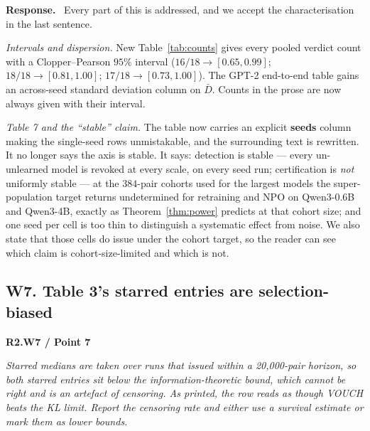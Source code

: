 \documentclass[11pt,a4paper]{article}
\newenvironment{point}[1]{%
  \par\medskip\noindent\textbf{\color{rcol}#1}\par\nopagebreak\smallskip\begingroup
  \color{rcol}\itshape}{\endgroup\par}
\newenvironment{reply}{%
  \par\smallskip\noindent\textbf{\color{acol}Response.}\ \begingroup}{\endgroup\par}
\begin{document}
\begin{reply}
Every part of this is addressed, and we accept the characterisation in the last
sentence.

\emph{Intervals and dispersion.} New Table~\ref{tab:counts} gives every pooled verdict count with a
Clopper--Pearson $95\%$ interval ($16/18 \to [0.65,0.99]$; $18/18 \to [0.81,1.00]$;
$17/18 \to [0.73,1.00]$). The GPT-2 end-to-end table gains an across-seed standard
deviation column on $\bar D$. Counts in the prose are now always given with their
interval.

\emph{Table 7 and the ``stable'' claim.} The table now carries an explicit
\textbf{seeds} column making the single-seed rows unmistakable, and the surrounding
text is rewritten. It no longer says the axis is stable. It says: detection is stable
--- every un-unlearned model is revoked at every scale, on every seed run; certification
is \emph{not} uniformly stable --- at the $384$-pair cohorts used for the largest models
the super-population target returns undetermined for retraining and NPO on Qwen3-0.6B
and Qwen3-4B, exactly as Theorem~\ref{thm:power} predicts at that cohort size; and one seed per cell
is too thin to distinguish a systematic effect from noise. We also state that those
cells do issue under the cohort target, so the reader can see which claim is
cohort-size-limited and which is not.
\end{reply}

\subsection*{W7. Table 3's starred entries are selection-biased}

\begin{point}{R2.W7 / Point 7}
Starred medians are taken over runs that issued within a 20,000-pair horizon, so both
starred entries sit below the information-theoretic bound, which cannot be right and is
an artefact of censoring. As printed, the row reads as though VOUCH beats the KL limit.
Report the censoring rate and either use a survival estimate or mark them as lower
bounds.
\end{point}
\end{document}
